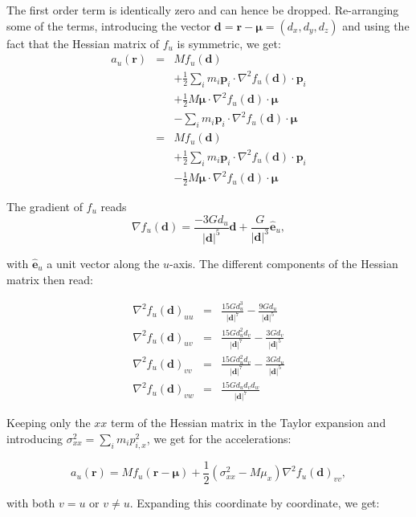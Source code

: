\documentclass[a4paper,10pt]{article}
\newcommand{\rr}{\mathbf{r}}
\newcommand{\dd}{\mathbf{d}}
\newcommand{\p}[1]{\mathbf{p}_#1}
\newcommand{\muu}{\boldsymbol{\mu}}
\begin{document}
The first order term is identically zero and can hence be dropped. Re-arranging some of the terms, introducing the 
vector $\dd=\rr-\muu=(d_x,d_y,d_z)$ and using the fact that the Hessian matrix of $f_u$ is symmetric, we get:
\begin{eqnarray}
 a_u(\rr) &=& Mf_u(\dd) \\
           & & + \frac{1}{2} \sum_i m_i \p{i}\cdot \nabla^2f_u(\dd)\cdot \p{i}  \\
           & & + \frac{1}{2} M \muu\cdot \nabla^2f_u(\dd)\cdot \muu \\
           & & - \sum_i m_i \p{i}\cdot \nabla^2f_u(\dd)\cdot \muu \\
           &=& Mf_u(\dd) \\
           & & + \frac{1}{2} \sum_i m_i \p{i}\cdot \nabla^2f_u(\dd)\cdot \p{i} \\
           & &- \frac{1}{2} M \muu\cdot \nabla^2f_u(\dd)\cdot \muu
\end{eqnarray}

The gradient of $f_u$ reads
\begin{equation}
 \nabla f_u(\dd) = \frac{-3Gd_u}{|\dd|^5}\dd + \frac{G}{|\dd|^3}\hat{\mathbf{e}}_u,
\end{equation}

with $\hat{\mathbf{e}}_u$ a unit vector along the $u$-axis. The different components of the Hessian matrix then read:

\begin{eqnarray}
 \nabla^2f_u(\dd)_{uu} &=& \frac{15Gd_u^3}{|\dd|^7} - \frac{9Gd_u}{|\dd|^5} \\
 \nabla^2f_u(\dd)_{uv} &=& \frac{15Gd_u^2d_v}{|\dd|^7} - \frac{3Gd_v}{|\dd|^5}\\
 \nabla^2f_u(\dd)_{vv} &=& \frac{15Gd_u^2d_v}{|\dd|^7} - \frac{3Gd_u}{|\dd|^5} \\
 \nabla^2f_u(\dd)_{vw} &=& \frac{15Gd_ud_vd_w}{|\dd|^7} 
\end{eqnarray}

Keeping only the $xx$ term of the Hessian matrix in the Taylor expansion and introducing $\sigma_{xx}^2 = 
\sum_im_ip_{i,x}^2$, we get for the accelerations:

\begin{equation}
 a_u(\rr) = Mf_u(\rr-\muu) + \frac{1}{2}(\sigma_{xx}^2 - M\mu_x)\nabla^2f_u(\dd)_{vv},
\end{equation}

with both $v=u$ or $v\neq u$. Expanding this coordinate by coordinate, we get:
\end{document}
